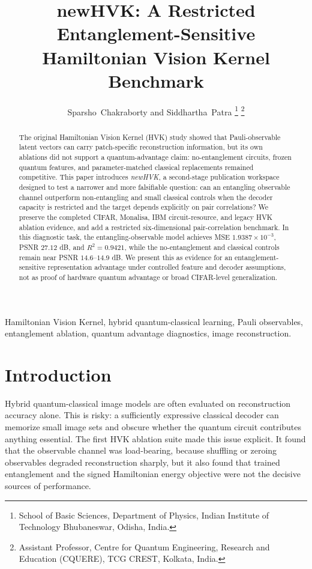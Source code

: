 \documentclass[journal]{IEEEtran}
\begin{document}
\title{newHVK: A Restricted Entanglement-Sensitive Hamiltonian Vision Kernel Benchmark}

\author{Sparsho~Chakraborty and Siddhartha~Patra%
\thanks{School of Basic Sciences, Department of Physics, Indian Institute of Technology Bhubaneswar, Odisha, India.}%
\thanks{Assistant Professor, Centre for Quantum Engineering, Research and Education (CQUERE), TCG CREST, Kolkata, India.}}

\maketitle

\begin{abstract}
The original Hamiltonian Vision Kernel (HVK) study showed that Pauli-observable latent vectors can carry patch-specific reconstruction information, but its own ablations did not support a quantum-advantage claim: no-entanglement circuits, frozen quantum features, and parameter-matched classical replacements remained competitive. This paper introduces \emph{newHVK}, a second-stage publication workspace designed to test a narrower and more falsifiable question: can an entangling observable channel outperform non-entangling and small classical controls when the decoder capacity is restricted and the target depends explicitly on pair correlations? We preserve the completed CIFAR, Monalisa, IBM circuit-resource, and legacy HVK ablation evidence, and add a restricted six-dimensional pair-correlation benchmark. In this diagnostic task, the entangling-observable model achieves MSE $1.9387\times10^{-3}$, PSNR $27.12$ dB, and $R^2=0.9421$, while the no-entanglement and classical controls remain near PSNR $14.6$--$14.9$ dB. We present this as evidence for an entanglement-sensitive representation advantage under controlled feature and decoder assumptions, not as proof of hardware quantum advantage or broad CIFAR-level generalization.
\end{abstract}

\begin{IEEEkeywords}
Hamiltonian Vision Kernel, hybrid quantum-classical learning, Pauli observables, entanglement ablation, quantum advantage diagnostics, image reconstruction.
\end{IEEEkeywords}

\section{Introduction}
Hybrid quantum-classical image models are often evaluated on reconstruction accuracy alone. This is risky: a sufficiently expressive classical decoder can memorize small image sets and obscure whether the quantum circuit contributes anything essential. The first HVK ablation suite made this issue explicit. It found that the observable channel was load-bearing, because shuffling or zeroing observables degraded reconstruction sharply, but it also found that trained entanglement and the signed Hamiltonian energy objective were not the decisive sources of performance.
\end{document}
